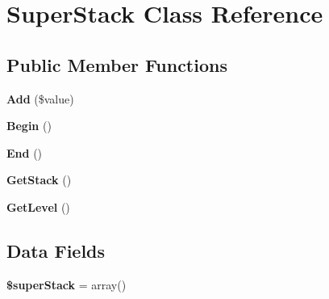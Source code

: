 \hypertarget{class_super_stack}{
\section{\-Super\-Stack \-Class \-Reference}
\label{class_super_stack}
}
\subsection*{\-Public \-Member \-Functions}
\begin{DoxyCompactItemize}
\item 
\hypertarget{class_super_stack_adba54dcf151f66452c90a611156020c5}{
{\bfseries \-Add} (\$value)}
\label{class_super_stack_adba54dcf151f66452c90a611156020c5}

\item 
\hypertarget{class_super_stack_a8ce592cbeb3f89a3551c138ca56b6a65}{
{\bfseries \-Begin} ()}
\label{class_super_stack_a8ce592cbeb3f89a3551c138ca56b6a65}

\item 
\hypertarget{class_super_stack_a5bed415bfef46529e2d92a8dc358feb3}{
{\bfseries \-End} ()}
\label{class_super_stack_a5bed415bfef46529e2d92a8dc358feb3}

\item 
\hypertarget{class_super_stack_ac6e60bf1d35a1323ebdd0c244ab52da4}{
{\bfseries \-Get\-Stack} ()}
\label{class_super_stack_ac6e60bf1d35a1323ebdd0c244ab52da4}

\item 
\hypertarget{class_super_stack_afe2924b84c7e0f80a1a6e76509da683b}{
{\bfseries \-Get\-Level} ()}
\label{class_super_stack_afe2924b84c7e0f80a1a6e76509da683b}

\end{DoxyCompactItemize}
\subsection*{\-Data \-Fields}
\begin{DoxyCompactItemize}
\item 
\hypertarget{class_super_stack_ace073c9a1a255e82ad85a0efec5865ea}{
{\bfseries \$super\-Stack} = array()}
\label{class_super_stack_ace073c9a1a255e82ad85a0efec5865ea}

\end{DoxyCompactItemize}
